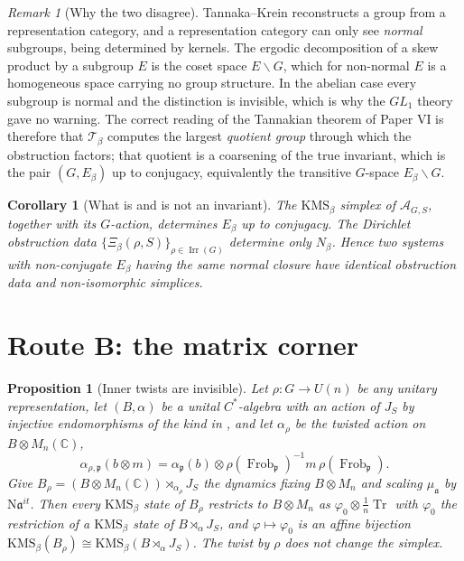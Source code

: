 \documentclass[11pt]{amsart}
\numberwithin{equation}{section}
\newtheorem{proposition}[theorem]{Proposition}
\newtheorem{corollary}[theorem]{Corollary}
\theoremstyle{definition}
\theoremstyle{remark}
\newtheorem{remark}[theorem]{Remark}
\newcommand{\C}{\mathbb{C}}
\newcommand{\cA}{\mathcal{A}}
\newcommand{\cT}{\mathcal{T}}
\newcommand{\pp}{\mathfrak{p}}
\newcommand{\aaa}{\mathfrak{a}}
\newcommand{\Ns}{\mathrm{N}}
\newcommand{\Frob}{\operatorname{Frob}}
\newcommand{\Irr}{\operatorname{Irr}}
\newcommand{\Tr}{\operatorname{Tr}}
\begin{document}
\begin{remark}[Why the two disagree]\label{rem:why}
Tannaka--Krein reconstructs a group from a representation category, and a representation
category can only see \emph{normal} subgroups, being determined by kernels. The ergodic
decomposition of a skew product by a subgroup $E$ is the coset space $E\backslash G$, which
for non-normal $E$ is a homogeneous space carrying no group structure. In the abelian case
every subgroup is normal and the distinction is invisible, which is why the $GL_1$ theory
gave no warning. The correct reading of the Tannakian theorem of Paper VI is therefore
that $\cT_\beta$ computes the largest \emph{quotient group} through which the obstruction
factors;
that quotient is a coarsening of the true invariant, which is the pair $(G,E_\beta)$ up to
conjugacy, equivalently the transitive $G$-space $E_\beta\backslash G$.
\end{remark}

\begin{corollary}[What is and is not an invariant]\label{cor:invariant}
The $\mathrm{KMS}_\beta$ simplex of $\cA_{G,S}$, together with its $G$-action, determines
$E_\beta$ up to conjugacy. The Dirichlet obstruction data
$\{\Xi_\beta(\rho,S)\}_{\rho\in\Irr(G)}$ determine only $N_\beta$. Hence two systems with
non-conjugate $E_\beta$ having the same normal closure have identical obstruction data and
non-isomorphic simplices.
\end{corollary}

\section{Route B: the matrix corner}

\begin{proposition}[Inner twists are invisible]\label{prop:corner}
Let $\rho:G\to U(n)$ be any unitary representation, let $(B,\alpha)$ be a unital
$C^*$-algebra with an action of $J_S$ by injective endomorphisms of the kind in
\cite[\S2]{Main}, and let $\alpha_\rho$ be the twisted action on $B\otimes M_n(\C)$,
\[
\alpha_{\rho,\pp}(b\otimes m)=\alpha_\pp(b)\otimes\rho(\Frob_\pp)^{-1}m\,\rho(\Frob_\pp).
\]
Give $B_\rho=(B\otimes M_n(\C))\rtimes_{\alpha_\rho}J_S$ the dynamics fixing $B\otimes M_n$
and scaling $\mu_\aaa$ by $\Ns\aaa^{it}$. Then every $\mathrm{KMS}_\beta$ state of $B_\rho$
restricts to $B\otimes M_n$ as $\varphi_0\otimes\tfrac1n\Tr$ with $\varphi_0$ the
restriction of a $\mathrm{KMS}_\beta$ state of $B\rtimes_\alpha J_S$, and
$\varphi\mapsto\varphi_0$ is an affine bijection
$\mathrm{KMS}_\beta(B_\rho)\cong\mathrm{KMS}_\beta(B\rtimes_\alpha J_S)$. The twist by
$\rho$ does not change the simplex.
\end{proposition}
\end{document}
